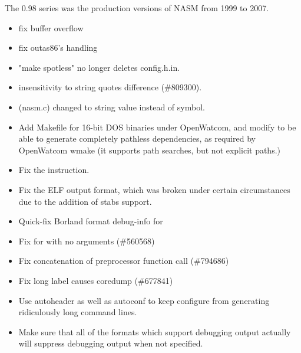 
The 0.98 series was the production versions of NASM from 1999 to 2007.


\begin{itemize}
    \item{fix buffer overflow}
    \item{fix outas86's  handling}
    \item{"make spotless" no longer deletes config.h.in.}
    \item{ insensitivity to string quotes difference (\#809300).}
    \item{(nasm.c) changed to string value instead of symbol.}
\end{itemize}


\begin{itemize}
    \item{Add Makefile for 16-bit DOS binaries under OpenWatcom, and modify
         to be able to generate completely pathless dependencies, as
        required by OpenWatcom wmake (it supports path searches, but not
        explicit paths.)}
    \item{Fix the  instruction.}
    \item{Fix the ELF output format, which was broken under certain
        circumstances due to the addition of stabs support.}
    \item{Quick-fix Borland format debug-info for }
    \item{Fix for  with no arguments (\#560568)}
    \item{Fix concatenation of preprocessor function call (\#794686)}
    \item{Fix long label causes coredump (\#677841)}
    \item{Use autoheader as well as autoconf to keep configure from generating
        ridiculously long command lines.}
    \item{Make sure that all of the formats which support debugging output
        actually will suppress debugging output when  not specified.}
\end{itemize}


